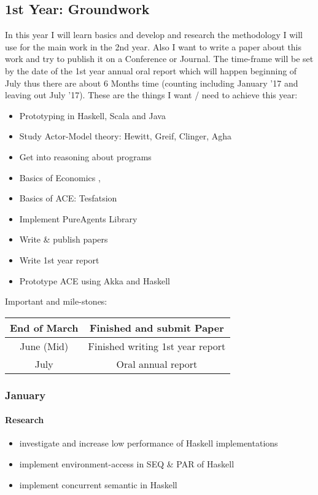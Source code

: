 \subsection{1st Year: Groundwork}
In this year I will learn basics and develop and research the methodology I will use for the main work in the 2nd year. Also I want to write a paper about this work and try to publish it on a Conference or Journal. The time-frame will be set by the date of the 1st year annual oral report which will happen beginning of July thus there are about 6 Months time (counting including January '17 and leaving out July '17). These are the things I want / need to achieve this year:

\begin{itemize}
\item Prototyping in Haskell, Scala and Java
\item Study Actor-Model theory: Hewitt, Greif, Clinger, Agha
\item Get into reasoning about programs
\item Basics of Economics \cite{bowles_understanding_2005}, \cite{kirman_complex_2010}
\item Basics of ACE: Tesfatsion
\item Implement PureAgents Library
\item Write \& publish papers
\item Write 1st year report
\item Prototype ACE using Akka and Haskell
\end{itemize}

Important and mile-stones:

\begin{center}
\begin{tabular}{ c|c } 
	End of March & Finished and submit Paper \\ 
	\hline
	June (Mid) & Finished writing 1st year report  \\ 
	\hline
	July & Oral annual report \\
\end{tabular}
\end{center}

\subsubsection{January}
\paragraph{Research} 
	\begin{itemize}
		\item investigate and increase low performance of Haskell implementations
		\item implement environment-access in SEQ \& PAR of Haskell
		\item implement concurrent semantic in Haskell
	\end{itemize}
		
